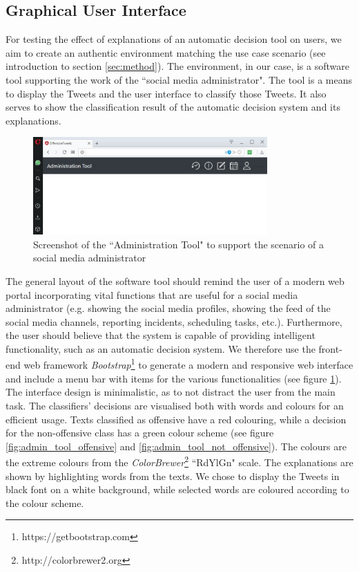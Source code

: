 \subsection{Graphical User Interface}
For testing the effect of explanations of an automatic decision tool on users, we aim to create an authentic environment matching the use case scenario (see introduction to section \ref{sec:method}). The environment, in our case, is a software tool supporting the work of the ``social media administrator". The tool is a means to display the Tweets and the user interface to classify those Tweets. It also serves to show the classification result of the automatic decision system and its explanations.\newline
\begin{figure} [H]
	\centering
	\includegraphics[width=0.8\textwidth]{img/administrationTool.JPG}
	\caption{Screenshot of the ``Administration Tool" to support the scenario of a social media administrator}
	\label{fig:admin_tool}
\end{figure}
\noindent The general layout of the software tool should remind the user of a modern web portal incorporating vital functions that are useful for a social media administrator (e.g. showing the social media profiles, showing the feed of the social media channels, reporting incidents, scheduling tasks, etc.). Furthermore, the user should believe that the system is capable of providing intelligent functionality, such as an automatic decision system. We therefore use the front-end web framework \textit{Bootstrap}\footnote{https://getbootstrap.com} to generate a modern and responsive web interface and include a menu bar with items for the various functionalities (see figure \ref{fig:admin_tool}). The interface design is minimalistic, as to not distract the user from the main task.\newline
The classifiers' decisions are visualised both with words and colours for an efficient usage. Texts classified as offensive have a red colouring, while a decision for the non-offensive class has a green colour scheme (see figure \ref{fig:admin_tool_offensive} and \ref{fig:admin_tool_not_offensive}). The colours are the extreme colours from the \textit{ColorBrewer}\footnote{http://colorbrewer2.org} ``RdYlGn" scale. The explanations are shown by highlighting words from the texts. We chose to display the Tweets in black font on a white background, while selected words are coloured according to the colour scheme.\newline
